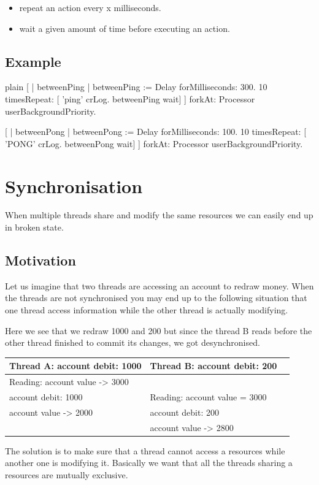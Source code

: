 \documentclass[10pt,twoside,english]{_support/latex/sbabook/sbabook}
\begin{document}
\begin{itemize}
\item repeat an action every x milliseconds.
\item wait a given amount of time before executing an action. 
\end{itemize}
\section{Example}
\begin{displaycode}{plain}
[
| betweenPing |  
betweenPing := Delay forMilliseconds: 300.
10 timesRepeat: [ 
   'ping' crLog. 
   betweenPing wait] 
   ] forkAt: Processor userBackgroundPriority.
	  
[
| betweenPong |  
betweenPong := Delay forMilliseconds: 100.
10 timesRepeat: [ 
   'PONG' crLog. 
   betweenPong wait]
   ] forkAt: Processor userBackgroundPriority.
\end{displaycode}
\chapter{Synchronisation}
When multiple threads share and modify the same resources we can easily end up in 
broken state. 
\section{Motivation}
Let us imagine that two threads are accessing an account to redraw money.
When the threads are not synchronised you may end up to the following situation
that one thread access information while the other thread is actually modifying. 

Here we see that we redraw 1000 and 200 but since the thread B reads before 
the other thread finished to commit its changes, we got desynchronised.

\begin{tabular}{lll}
\toprule
\textbf{Thread A: account debit: 1000} & \textbf{Thread B: account debit: 200} &  \\
\midrule
Reading: account value -\textgreater{} 3000 &  &  \\
account debit: 1000 & Reading: account value = 3000 &  \\
account value -\textgreater{} 2000 & account debit: 200 &  \\
 & account value -\textgreater{} 2800 \\
\bottomrule
\end{tabular}

The solution is to make sure that a thread cannot access a resources while another one is modifying it. Basically we want that all the threads sharing a resources are mutually exclusive. 
\end{document}
